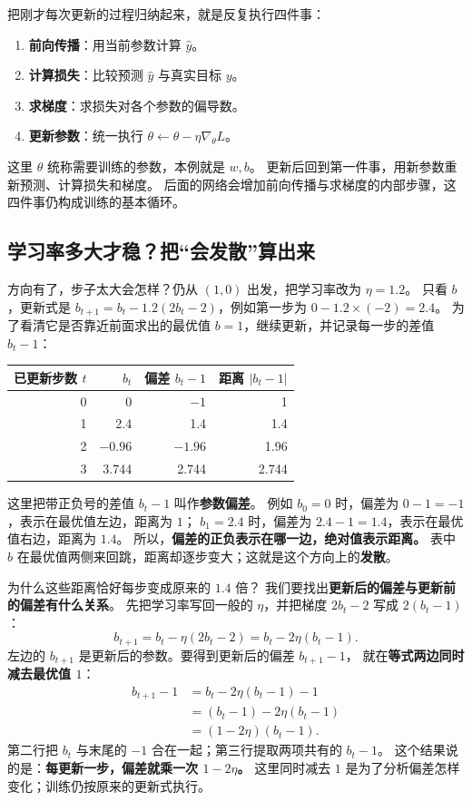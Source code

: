 把刚才每次更新的过程归纳起来，就是反复执行四件事：
\begin{enumerate}
\item \textbf{前向传播}：用当前参数计算 $\widehat{y}$。
\item \textbf{计算损失}：比较预测 $\widehat{y}$ 与真实目标 $y$。
\item \textbf{求梯度}：求损失对各个参数的偏导数。
\item \textbf{更新参数}：统一执行 $\theta\leftarrow\theta-\eta\nabla_\theta L$。
\end{enumerate}
这里 $\theta$ 统称需要训练的参数，本例就是 $w,b$。
更新后回到第一件事，用新参数重新预测、计算损失和梯度。
后面的网络会增加前向传播与求梯度的内部步骤，这四件事仍构成训练的基本循环。\label{route:gradient-end}

\subsection{学习率多大才稳？把“会发散”算出来}
\label{experiment:learning-rate-stability}

方向有了，步子太大会怎样？仍从 $(1,0)$ 出发，把学习率改为 $\eta=1.2$。
只看 $b$，更新式是 $b_{t+1}=b_t-1.2(2b_t-2)$，例如第一步为 $0-1.2\times(-2)=2.4$。
为了看清它是否靠近前面求出的最优值 $b=1$，继续更新，并记录每一步的差值 $b_t-1$：
\begin{center}\small
{}
\begin{tabular}{rrrr}
\toprule
已更新步数 $t$ & $b_t$ & 偏差 $b_t-1$ & 距离 $|b_t-1|$\\\midrule
0 & 0 & $-1$ & 1\\
1 & 2.4 & 1.4 & 1.4\\
2 & $-0.96$ & $-1.96$ & 1.96\\
3 & 3.744 & 2.744 & 2.744\\
\bottomrule
\end{tabular}
\end{center}
这里把带正负号的差值 $b_t-1$ 叫作\textbf{参数偏差}。
例如 $b_0=0$ 时，偏差为 $0-1=-1$，表示在最优值左边，距离为 $1$；
$b_1=2.4$ 时，偏差为 $2.4-1=1.4$，表示在最优值右边，距离为 $1.4$。
所以，\textbf{偏差的正负表示在哪一边，绝对值表示距离。}
表中 $b$ 在最优值两侧来回跳，距离却逐步变大；这就是这个方向上的\textbf{发散}。

为什么这些距离恰好每步变成原来的 $1.4$ 倍？
我们要找出\textbf{更新后的偏差与更新前的偏差有什么关系}。
先把学习率写回一般的 $\eta$，并把梯度 $2b_t-2$ 写成 $2(b_t-1)$：
\[
b_{t+1}=b_t-\eta(2b_t-2)=b_t-2\eta(b_t-1).
\]
左边的 $b_{t+1}$ 是更新后的参数。要得到更新后的偏差 $b_{t+1}-1$，
就在\textbf{等式两边同时减去最优值 $1$}：
\[
\begin{aligned}
b_{t+1}-1
&=b_t-2\eta(b_t-1)-1\\
&=(b_t-1)-2\eta(b_t-1)\\
&=(1-2\eta)(b_t-1).
\end{aligned}
\]
第二行把 $b_t$ 与末尾的 $-1$ 合在一起；第三行提取两项共有的 $b_t-1$。
这个结果说的是：\textbf{每更新一步，偏差就乘一次 $1-2\eta$。}
这里同时减去 $1$ 是为了分析偏差怎样变化；训练仍按原来的更新式执行。

